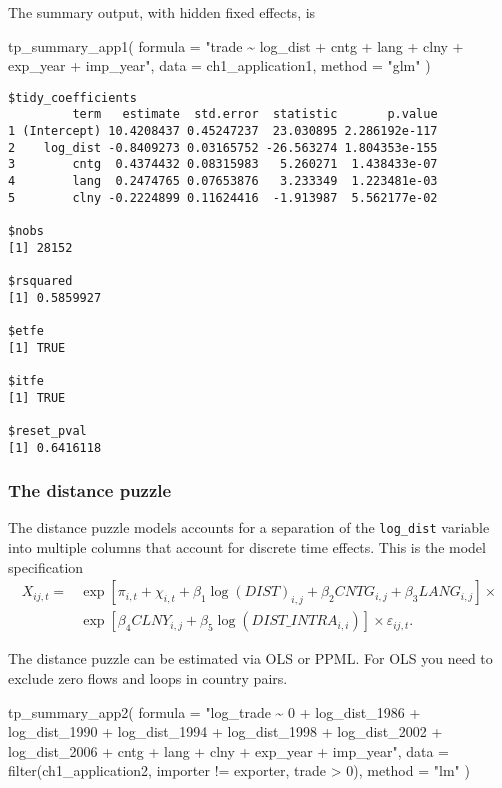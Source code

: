 \documentclass[12pt,reqno,oneside,pdftex]{formato-puc/puctesis} %
\newenvironment{Shaded}{\begin{snugshade}}{\end{snugshade}}
\newcommand{\AttributeTok}[1]{\textcolor[rgb]{0.77,0.63,0.00}{#1}}
\newcommand{\DecValTok}[1]{\textcolor[rgb]{0.00,0.00,0.81}{#1}}
\newcommand{\FunctionTok}[1]{\textcolor[rgb]{0.00,0.00,0.00}{#1}}
\newcommand{\NormalTok}[1]{#1}
\newcommand{\SpecialCharTok}[1]{\textcolor[rgb]{0.00,0.00,0.00}{#1}}
\newcommand{\StringTok}[1]{\textcolor[rgb]{0.31,0.60,0.02}{#1}}
\begin{document}
The summary output, with hidden fixed effects, is

\begin{Shaded}
\begin{Highlighting}[]
\FunctionTok{tp\_summary\_app1}\NormalTok{(}
  \AttributeTok{formula =} \StringTok{"trade \textasciitilde{} log\_dist + cntg + lang + clny + exp\_year + imp\_year"}\NormalTok{,}
  \AttributeTok{data =}\NormalTok{ ch1\_application1,}
  \AttributeTok{method =} \StringTok{"glm"}
\NormalTok{)}
\end{Highlighting}
\end{Shaded}

\begin{verbatim}
$tidy_coefficients
         term   estimate  std.error  statistic       p.value
1 (Intercept) 10.4208437 0.45247237  23.030895 2.286192e-117
2    log_dist -0.8409273 0.03165752 -26.563274 1.804353e-155
3        cntg  0.4374432 0.08315983   5.260271  1.438433e-07
4        lang  0.2474765 0.07653876   3.233349  1.223481e-03
5        clny -0.2224899 0.11624416  -1.913987  5.562177e-02

$nobs
[1] 28152

$rsquared
[1] 0.5859927

$etfe
[1] TRUE

$itfe
[1] TRUE

$reset_pval
[1] 0.6416118
\end{verbatim}

\hypertarget{the-distance-puzzle}{%
\subsubsection{The distance puzzle}\label{the-distance-puzzle}}

The distance puzzle models accounts for a separation of the
\texttt{log\_dist} variable into multiple columns that account for
discrete time effects. This is the model specification \begin{align*}
X_{ij,t} =& \exp\left[\pi_{i,t} + \chi_{i,t} + \beta_1 \log(DIST)_{i,j} + \beta_2 CNTG_{i,j} + \beta_3 LANG_{i,j}\right]\times\\
\text{ }& \exp\left[\beta_4 CLNY_{i,j} + \beta_5 \log(DIST\_INTRA_{i,i})\right] \times \varepsilon_{ij,t}.
\end{align*}

The distance puzzle can be estimated via OLS or PPML. For OLS you need
to exclude zero flows and loops in country pairs.

\begin{Shaded}
\begin{Highlighting}[]
\FunctionTok{tp\_summary\_app2}\NormalTok{(}
  \AttributeTok{formula =} \StringTok{"log\_trade \textasciitilde{} 0 + log\_dist\_1986 + log\_dist\_1990 + log\_dist\_1994 +}
\StringTok{    log\_dist\_1998 + log\_dist\_2002 + log\_dist\_2006 + cntg +}
\StringTok{    lang + clny + exp\_year + imp\_year"}\NormalTok{,}
  \AttributeTok{data =} \FunctionTok{filter}\NormalTok{(ch1\_application2, importer }\SpecialCharTok{!=}\NormalTok{ exporter, trade }\SpecialCharTok{\textgreater{}} \DecValTok{0}\NormalTok{),}
  \AttributeTok{method =} \StringTok{"lm"}
\NormalTok{)}
\end{Highlighting}
\end{Shaded}
\end{document}
